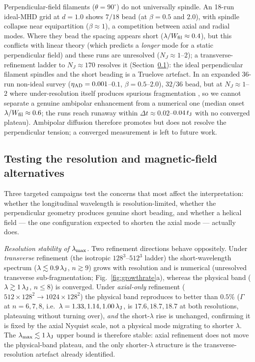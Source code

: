 \documentclass[usenatbib,twoside,twocolumn]{mnras}
\begin{document}
Perpendicular-field filaments ($\theta=90^\circ$) do not universally spindle. An 18-run ideal-MHD grid at $d=1.0$ shows $7/18$ bead (at $\beta=0.5$ and $2.0$), with spindle collapse near equipartition ($\beta\approx1$), a competition between axial and radial modes. Where they bead the spacing appears short ($\lambda/W_{\rm fil}\approx0.4$), but this conflicts with linear theory (which predicts a \emph{longer} mode for a static perpendicular field) and these runs are unresolved ($N_J\approx1$--$2$); a transverse-refinement ladder to $N_J\approx170$ resolves it (Section~\ref{sec:optional_tests}): the ideal perpendicular filament spindles and the short beading is a Truelove artefact. In an expanded 36-run non-ideal survey ($\eta_{\rm AD}=0.001$--$0.1$, $\beta=0.5$--$2.0$), $32/36$ bead, but at $N_J\approx1$--$2$ where under-resolution itself produces spurious fragmentation \citep{Truelove1997}, so we cannot separate a genuine ambipolar enhancement from a numerical one (median onset $\lambda/W_{\rm fil}\approx0.6$; the runs reach runaway within $\Delta t\approx0.02$--$0.04\,t_{\rm J}$ with no converged plateau). Ambipolar diffusion therefore promotes but does not resolve the perpendicular tension; a converged measurement is left to future work.

\subsection{Testing the resolution and magnetic-field alternatives}
\label{sec:optional_tests}
Three targeted campaigns test the concerns that most affect the interpretation: whether the longitudinal wavelength is resolution-limited, whether the perpendicular geometry produces genuine short beading, and whether a helical field --- the one configuration expected to shorten the axial mode --- actually does.

\emph{Resolution stability of $\lambda_{\rm max}$.} Two refinement directions behave oppositely. Under \emph{transverse} refinement (the isotropic $128^3$--$512^3$ ladder) the short-wavelength spectrum ($\lambda\lesssim0.9\,\lambda_{\rm J}$, $n\gtrsim9$) grows with resolution and is numerical (unresolved transverse sub-fragmentation; Fig.~\ref{fig:growthrate}a), whereas the physical band ($\lambda\gtrsim1\,\lambda_{\rm J}$, $n\leq8$) is converged. Under \emph{axial-only} refinement ($512\times128^2\to1024\times128^2$) the physical band reproduces to better than $0.5\%$ ($\Gamma$ at $n=6,7,8$, i.e.\ $\lambda=1.33,1.14,1.00\,\lambda_{\rm J}$, is $17.6,18.7,18.7$ at both resolutions, plateauing without turning over), \emph{and} the short-$\lambda$ rise is unchanged, confirming it is fixed by the axial Nyquist scale, not a physical mode migrating to shorter $\lambda$. The $\lambda_{\rm max}\lesssim1\,\lambda_{\rm J}$ upper bound is therefore stable: axial refinement does not move the physical-band plateau, and the only shorter-$\lambda$ structure is the transverse-resolution artefact already identified.
\end{document}
